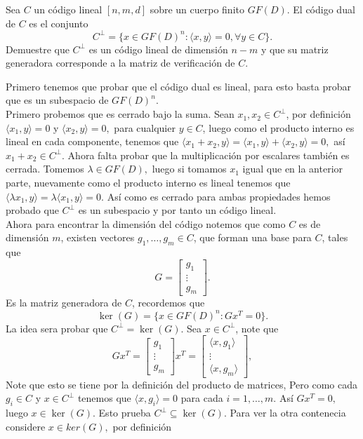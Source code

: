 
Sea $C$ un código lineal $[n,m,d]$ sobre un cuerpo finito $GF(D).$ El código dual de $C$ es el conjunto
$$C^{\perp}=\{x\in GF(D)^n:\langle x,y\rangle=0,\forall y\in C\}.$$
Demuestre que $C^{\perp}$ es un código lineal de dimensión $n-m$ y que su matriz generadora corresponde a la matriz de verificación de $C.$
\begin{sproof}
    Primero tenemos que probar que el código dual es lineal, para esto basta probar que es un subespacio de $GF(D)^n.$\\
    Primero probemos que es cerrado bajo la suma. Sean $x_1,x_2\in C^\perp$, por definición $\langle x_1,y\rangle=0$ y $\langle x_2,y\rangle=0,$ para cualquier $y\in C$, luego como el producto interno es lineal en cada componente, tenemos que $\langle x_1+x_2,y\rangle=\langle x_1,y\rangle+\langle x_2,y\rangle=0,$ así $x_1+x_2\in C^\perp.$ Ahora falta probar que la multiplicación por escalares también es cerrada. Tomemos $\lambda\in GF(D),$ luego si tomamos $x_1$ igual que en la anterior parte, nuevamente como el producto interno es lineal tenemos que $\langle \lambda x_1,y\rangle=\lambda\langle x_1,y\rangle=0.$ Así como es cerrado para ambas propiedades hemos probado que $C^\perp$ es un subespacio y por tanto un código lineal.\\
    Ahora para encontrar la dimensión del código notemos que como $C$ es de dimensión $m$, existen vectores $g_1,\ldots,g_m\in C$, que forman una base para $C$, tales que
    $$G=\begin{bmatrix}
        g_1\\
    \vdots\\
    g_m
    \end{bmatrix}.$$
    Es la matriz generadora de $C$, recordemos que 
    $$\ker(G)=\{x\in GF(D)^n:Gx^T=0\}.$$
    La idea sera probar que $C^\perp=\ker(G)$. Sea $x\in C^\perp$,
    note que 
    $$Gx^T=\begin{bmatrix}
        g_1\\
    \vdots\\
    g_m
    \end{bmatrix}x^T=\begin{bmatrix}
        \langle x,g_1\rangle\\
        \vdots\\
        \langle x,g_m\rangle
    \end{bmatrix},$$
    Note que esto se tiene por la definición del producto de matrices, Pero como cada $g_i\in C$ y $x\in C^\perp$ tenemos que $\langle x,g_i\rangle=0$ para cada $i=1,\ldots, m.$ Así $Gx^T=0,$ luego $x\in \ker(G).$ Esto prueba $C^\perp \subseteq \ker(G).$ Para ver la otra contenecia considere $x\in ker (G),$ por definición

\end{sproof}
